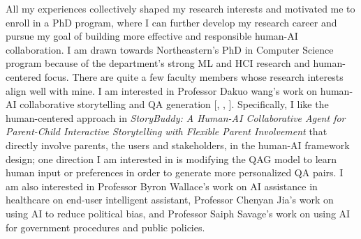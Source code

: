 


All my experiences collectively shaped my research interests and motivated me to enroll in a PhD program, where I can further develop my research career and pursue my goal of building more effective and responsible human-AI collaboration. I am drawn towards Northeastern's PhD in Computer Science program because of the department's strong ML and HCI research and human-centered focus.
There are quite a few faculty members whose research interests align well with mine. 
I am interested in Professor Dakuo wang's work on human-AI collaborative storytelling and QA generation [, , ]. Specifically, I like the human-centered approach in \textit{StoryBuddy: A Human-AI Collaborative Agent for Parent-Child Interactive Storytelling with Flexible Parent Involvement} that directly involve parents, the users and stakeholders, in the human-AI framework design; one direction I am interested in is modifying the QAG model to learn human input or preferences in order to generate more personalized QA pairs.
I am also interested in Professor Byron Wallace's work on AI assistance in healthcare on end-user intelligent assistant, Professor Chenyan Jia's work on using AI to reduce political bias, and Professor Saiph Savage's work on using AI for government procedures and public policies.
